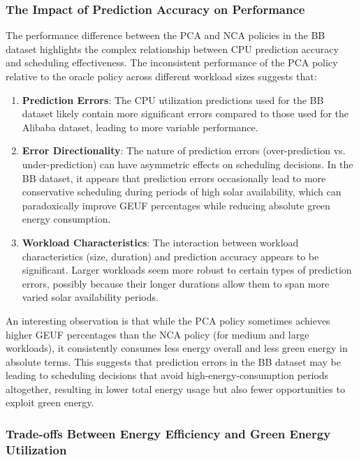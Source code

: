 \subsubsection{The Impact of Prediction Accuracy on Performance}

The performance difference between the PCA and NCA policies in the BB dataset highlights the complex relationship between CPU prediction accuracy and scheduling effectiveness. The inconsistent performance of the PCA policy relative to the oracle policy across different workload sizes suggests that:

\begin{enumerate}
    \item \textbf{Prediction Errors}: The CPU utilization predictions used for the BB dataset likely contain more significant errors compared to those used for the Alibaba dataset, leading to more variable performance.
    
    \item \textbf{Error Directionality}: The nature of prediction errors (over-prediction vs. under-prediction) can have asymmetric effects on scheduling decisions. In the BB dataset, it appears that prediction errors occasionally lead to more conservative scheduling during periods of high solar availability, which can paradoxically improve GEUF percentages while reducing absolute green energy consumption.
    
    \item \textbf{Workload Characteristics}: The interaction between workload characteristics (size, duration) and prediction accuracy appears to be significant. Larger workloads seem more robust to certain types of prediction errors, possibly because their longer durations allow them to span more varied solar availability periods.
\end{enumerate}

An interesting observation is that while the PCA policy sometimes achieves higher GEUF percentages than the NCA policy (for medium and large workloads), it consistently consumes less energy overall and less green energy in absolute terms. This suggests that prediction errors in the BB dataset may be leading to scheduling decisions that avoid high-energy-consumption periods altogether, resulting in lower total energy usage but also fewer opportunities to exploit green energy.

\subsubsection{Trade-offs Between Energy Efficiency and Green Energy Utilization}

